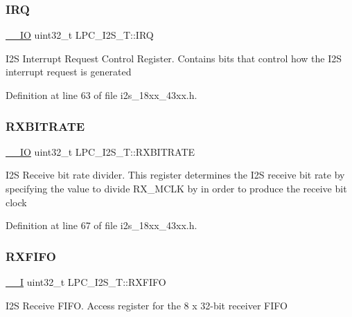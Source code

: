 \subsubsection{\texorpdfstring{I\+RQ}{IRQ}}
{\footnotesize\ttfamily \hyperlink{core__sc300_8h_aec43007d9998a0a0e01faede4133d6be}{\+\_\+\+\_\+\+IO} uint32\+\_\+t L\+P\+C\+\_\+\+I2\+S\+\_\+\+T\+::\+I\+RQ}

I2S Interrupt Request Control Register. Contains bits that control how the I2S interrupt request is generated 

Definition at line 63 of file i2s\+\_\+18xx\+\_\+43xx.\+h.

\mbox{\label{struct_l_p_c___i2_s___t_a3f0c2587313eb723ac48ad06af157df9}} 
\subsubsection{\texorpdfstring{R\+X\+B\+I\+T\+R\+A\+TE}{RXBITRATE}}
{\footnotesize\ttfamily \hyperlink{core__sc300_8h_aec43007d9998a0a0e01faede4133d6be}{\+\_\+\+\_\+\+IO} uint32\+\_\+t L\+P\+C\+\_\+\+I2\+S\+\_\+\+T\+::\+R\+X\+B\+I\+T\+R\+A\+TE}

I2S Receive bit rate divider. This register determines the I2S receive bit rate by specifying the value to divide R\+X\+\_\+\+M\+C\+LK by in order to produce the receive bit clock 

Definition at line 67 of file i2s\+\_\+18xx\+\_\+43xx.\+h.

\mbox{\label{struct_l_p_c___i2_s___t_aac5c44248c1354eb4320eb5fa5b18baa}} 
\subsubsection{\texorpdfstring{R\+X\+F\+I\+FO}{RXFIFO}}
{\footnotesize\ttfamily \hyperlink{core__sc300_8h_af63697ed9952cc71e1225efe205f6cd3}{\+\_\+\+\_\+I} uint32\+\_\+t L\+P\+C\+\_\+\+I2\+S\+\_\+\+T\+::\+R\+X\+F\+I\+FO}

I2S Receive F\+I\+FO. Access register for the 8 x 32-\/bit receiver F\+I\+FO 

